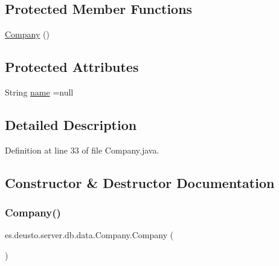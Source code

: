 \subsection*{Protected Member Functions}
\begin{DoxyCompactItemize}
\item 
\hyperlink{classes_1_1deusto_1_1server_1_1db_1_1data_1_1_company_a7cdcf21ca7d46ba7becd8db63135f4fc}{Company} ()
\end{DoxyCompactItemize}
\subsection*{Protected Attributes}
\begin{DoxyCompactItemize}
\item 
String \hyperlink{classes_1_1deusto_1_1server_1_1db_1_1data_1_1_company_a3080458c34b5cf83c7f8e866a93e60ac}{name} =null
\end{DoxyCompactItemize}


\subsection{Detailed Description}


Definition at line 33 of file Company.\+java.



\subsection{Constructor \& Destructor Documentation}
\mbox{\label{classes_1_1deusto_1_1server_1_1db_1_1data_1_1_company_a7cdcf21ca7d46ba7becd8db63135f4fc}} 
\subsubsection{\texorpdfstring{Company()}{Company()}\hspace{0.1cm}{\footnotesize\ttfamily [1/2]}}
{\footnotesize\ttfamily es.\+deusto.\+server.\+db.\+data.\+Company.\+Company (\begin{DoxyParamCaption}{ }\end{DoxyParamCaption})\hspace{0.3cm}{\ttfamily [protected]}}




